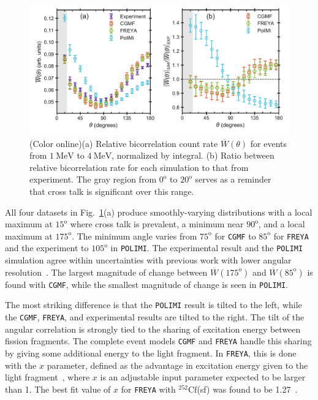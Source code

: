 \documentclass[preprint,12pt]{elsarticle}
\newcommand{\fig}[1]     {Fig.~\ref{#1}}
\newcommand{\cgmf}            {\texttt{CGMF}\xspace}
\newcommand{\freya}           {\texttt{FREYA}\xspace}
\newcommand{\polimi}          {\texttt{POLIMI}\xspace}
\newcommand{\coloronline}     {(Color online)\xspace}
\newcommand{\Wtheta}         {\ensuremath{\overline{W}(\theta)}\xspace}
\newcommand{\Wth}[1]         {\ensuremath{\overline{W}(\degrees{#1})}\xspace}
\newcommand{\genunit}[2]{\ensuremath{#1~\text{#2}}\xspace}
\newcommand{\MeV}[1]    {\genunit{#1}{MeV}}
\newcommand{\degrees}[1]{\ensuremath{#1^{\mathrm{o}}}\xspace}
\newcommand{\Cftft}{\ensuremath{^{252}\text{Cf}}\xspace}
\begin{document}
\begin{figure}[!t]	
	\centering
	\includegraphics[trim={0cm 0cm 0cm 0cm},clip,width=7in]{W_figs.png}	
	\caption{\coloronline (a) Relative bicorrelation count rate \Wtheta for events from \MeV{1} to \MeV{4}, normalized by integral. (b) Ratio between relative bicorrelation rate for each simulation to that from experiment. The gray region from \degrees{0} to \degrees{20} serves as a reminder that cross talk is significant over this range.}
	\label{fig:W}
\end{figure}

All four datasets in \fig{fig:W}(a) produce smoothly-varying distributions with a local maximum at \degrees{15} where cross talk is prevalent, a minimum near \degrees{90}, and a local maximum at \degrees{175}. The minimum angle varies from \degrees{75} for \cgmf to \degrees{85} for \freya and the experiment to \degrees{105} in \polimi. The experimental result and the \polimi simulation agree within uncertainties with previous work with lower angular resolution~\cite{Larsen2014}. The largest magnitude of change between $\Wth{175}$ and $\Wth{85}$ is found with \cgmf, while the smallest magnitude of change is seen in \polimi. 

The most striking difference is that the \polimi result is tilted to the left, while the \cgmf, \freya, and experimental results are tilted to the right. The tilt of the angular correlation is strongly tied to the sharing of excitation energy between fission fragments. The complete event models \cgmf and \freya handle this sharing by giving some additional energy to the light fragment. In \freya, this is done with the $x$ parameter, defined as the advantage in excitation energy given to the light fragment~\cite{Vogt2014}, where $x$ is an adjustable input parameter expected to be larger than 1. The best fit value of $x$ for \freya with \Cftft(sf) was found to be 1.27~\cite{VanDyke2018}.  
\end{document}
